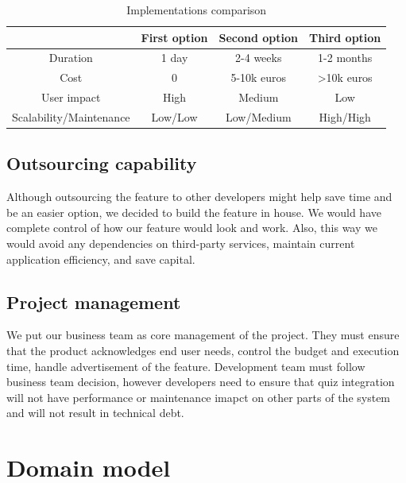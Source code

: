 \documentclass[
    english, %
]{VUMIFPSkursinis}
\begin{document}
\begin{table}[H]
    \centering
    \begin{tabular}{|c|c|c|c|}
        \hline
                                & First option & Second option & Third option \\
        \hline
        Duration                & 1 day        & 2-4 weeks     & 1-2 months   \\
        \hline
        Cost                    & 0            & 5-10k euros   & >10k euros   \\
        \hline
        User impact             & High         & Medium        & Low          \\
        \hline
        Scalability/Maintenance & Low/Low      & Low/Medium    & High/High    \\
        \hline
    \end{tabular}
    \caption{Implementations comparison}
    \label{tab:implementations-comparison}
\end{table}

\subsection{Outsourcing capability}

Although outsourcing the feature to other developers might help save time and be an easier option, we decided to build the feature in house. We would have complete control of how our feature would look and work. Also, this way we would avoid any dependencies on third-party services, maintain current application efficiency, and save capital.

\subsection{Project management}

We put our business team as core management of the project. They must ensure that the product acknowledges end user needs, control the budget and execution time, handle advertisement of the feature. Development team must follow business team decision, however developers need to ensure that quiz integration will not have performance or maintenance imapct on other parts of the system and will not result in technical debt.

\section{Domain model}
\end{document}
